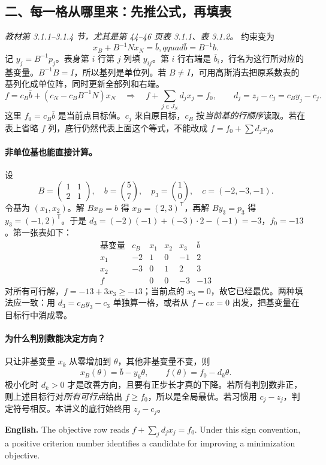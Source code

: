 \documentclass[UTF8,11pt,a4paper]{ctexart}
\newcommand{\EN}[1]{\par\noindent \textbf{English.} #1\par}
\begin{document}
\clearpage
\subsection*{二、每一格从哪里来：先推公式，再填表}
\noindent\textit{教材第 3.1.1--3.1.4 节，尤其是第 44--46 页表 3.1.1、表 3.1.2。}
约束变为
\[
  x_B+B^{-1}Nx_N=\bar b,qquad \bar b=B^{-1}b.
\]
记 $y_j=B^{-1}p_j$。表身第 $i$ 行第 $j$ 列填 $y_{ij}$。第 $i$ 行右端是 $\bar b_i$，行名为这行所对应的基变量。$B^{-1}B=I$，所以基列是单位列。若 $B\ne I$，可用高斯消去把原系数表的基列化成单位阵，同时更新全部列和右端。
\[
 f=c_B\bar b+(c_N-c_BB^{-1}N)x_N
 \quad\Longrightarrow\quad
 f+\sum_{j\in J_N}d_jx_j=f_0,
 \qquad d_j=z_j-c_j=c_By_j-c_j.
\]
这里 $f_0=c_B\bar b$ 是当前点目标值。$c_j$ 来自原目标，$c_B$ 按\emph{当前基的行顺序}读取。若在表上省略 $f$ 列，底行仍然代表上面这个等式，不能改成 $f=f_0+\sum d_jx_j$。

\paragraph{非单位基也能直接计算。}
设
\[
 B=\begin{pmatrix}1&1\\2&1\end{pmatrix},\quad
 b=\binom{5}{7},\quad p_3=\binom{1}{0},\quad c=(-2,-3,-1).
\]
令基为 $(x_1,x_2)$。解 $Bx_B=b$ 得 $x_B=(2,3)^{\mathsf T}$，再解 $By_3=p_3$ 得 $y_3=(-1,2)^{\mathsf T}$。于是 $d_3=(-2)(-1)+(-3)\cdot2-(-1)=-3$，$f_0=-13$。第一张表如下：
\[
\begin{array}{c|r|rrr|r}
\text{基变量}&c_B&x_1&x_2&x_3&\bar b\\\hline
x_1&-2&1&0&-1&2\\
x_2&-3&0&1&2&3\\\hline
f&&0&0&-3&-13
\end{array}
\]
对所有可行解，$f=-13+3x_3\ge-13$；当前点的 $x_3=0$，故它已经最优。两种填法应一致：用 $d_3=c_By_3-c_3$ 单独算一格，或者从 $f-cx=0$ 出发，把基变量在目标行中消成零。

\paragraph{为什么判别数能决定方向？}
只让非基变量 $x_k$ 从零增加到 $\theta$，其他非基变量不变，则
\[
 x_B(\theta)=\bar b-y_k\theta,\qquad f(\theta)=f_0-d_k\theta.
\]
极小化时 $d_k>0$ 才是改善方向，且要有正步长才真的下降。若所有判别数非正，则上述目标行对\emph{所有可行点}给出 $f\ge f_0$，所以是全局最优。若习惯用 $c_j-z_j$，判定符号相反。本讲义的底行始终用 $z_j-c_j$。
\EN{The objective row reads $f+\sum_j d_jx_j=f_0$. Under this sign convention, a positive criterion number identifies a candidate for improving a minimization objective.}
\end{document}
